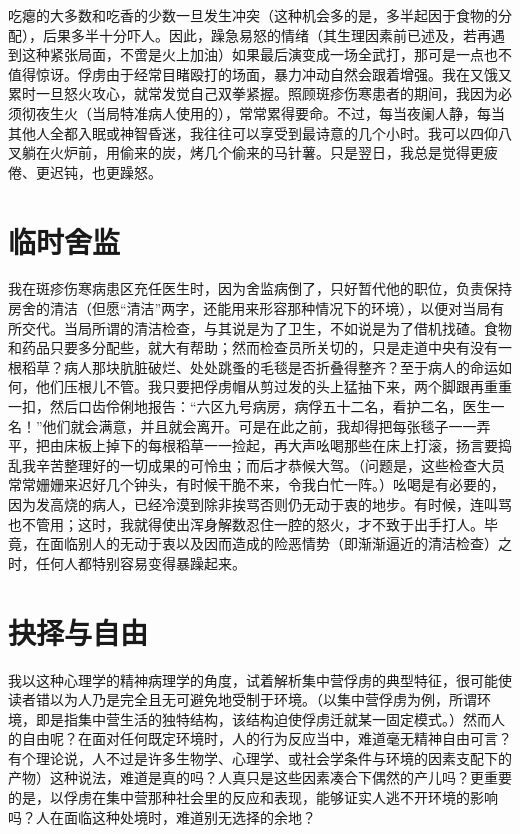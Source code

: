 \documentclass[11pt,oneside]{book}
\begin{document}
\begin{common-format}
吃瘪的大多数和吃香的少数一旦发生冲突（这种机会多的是，多半起因于食物的分配），后果多半十分吓人。因此，躁急易怒的情绪（其生理因素前已述及，若再遇到这种紧张局面，不啻是火上加油）如果最后演变成一场全武打，那可是一点也不值得惊讶。俘虏由于经常目睹殴打的场面，暴力冲动自然会跟着增强。我在又饿又累时一旦怒火攻心，就常发觉自己双拳紧握。照顾斑疹伤寒患者的期间，我因为必须彻夜生火（当局特准病人使用的），常常累得要命。不过，每当夜阑人静，每当其他人全都入眠或神智昏迷，我往往可以享受到最诗意的几个小时。我可以四仰八叉躺在火炉前，用偷来的炭，烤几个偷来的马针薯。只是翌日，我总是觉得更疲倦、更迟钝，也更躁怒。


\section{临时舍监}
我在斑疹伤寒病患区充任医生时，因为舍监病倒了，只好暂代他的职位，负责保持房舍的清洁（但愿“清洁”两字，还能用来形容那种情况下的环境），以便对当局有所交代。当局所谓的清洁检查，与其说是为了卫生，不如说是为了借机找碴。食物和药品只要多分配些，就大有帮助；然而检查员所关切的，只是走道中央有没有一根稻草？病人那块肮脏破烂、处处跳蚤的毛毯是否折叠得整齐？至于病人的命运如何，他们压根儿不管。我只要把俘虏帽从剪过发的头上猛抽下来，两个脚跟再重重一扣，然后口齿伶俐地报告：“六区九号病房，病俘五十二名，看护二名，医生一名！”他们就会满意，并且就会离开。可是在此之前，我却得把每张毯子一一弄平，把由床板上掉下的每根稻草一一捡起，再大声吆喝那些在床上打滚，扬言要捣乱我辛苦整理好的一切成果的可怜虫；而后才恭候大驾。（问题是，这些检查大员常常姗姗来迟好几个钟头，有时候干脆不来，令我白忙一阵。）吆喝是有必要的，因为发高烧的病人，已经冷漠到除非挨骂否则仍无动于衷的地步。有时候，连叫骂也不管用；这时，我就得使出浑身解数忍住一腔的怒火，才不致于出手打人。毕竟，在面临别人的无动于衷以及因而造成的险恶情势（即渐渐逼近的清洁检查）之时，任何人都特别容易变得暴躁起来。


\section{抉择与自由}
我以这种心理学的精神病理学的角度，试着解析集中营俘虏的典型特征，很可能使读者错以为人乃是完全且无可避免地受制于环境。（以集中营俘虏为例，所谓环境，即是指集中营生活的独特结构，该结构迫使俘虏迁就某一固定模式。）然而人的自由呢？在面对任何既定环境时，人的行为反应当中，难道毫无精神自由可言？有个理论说，人不过是许多生物学、心理学、或社会学条件与环境的因素支配下的产物）这种说法，难道是真的吗？人真只是这些因素凑合下偶然的产儿吗？更重要的是，以俘虏在集中营那种社会里的反应和表现，能够证实人逃不开环境的影响吗？人在面临这种处境时，难道别无选择的余地？


\end{common-format}
\end{document}
